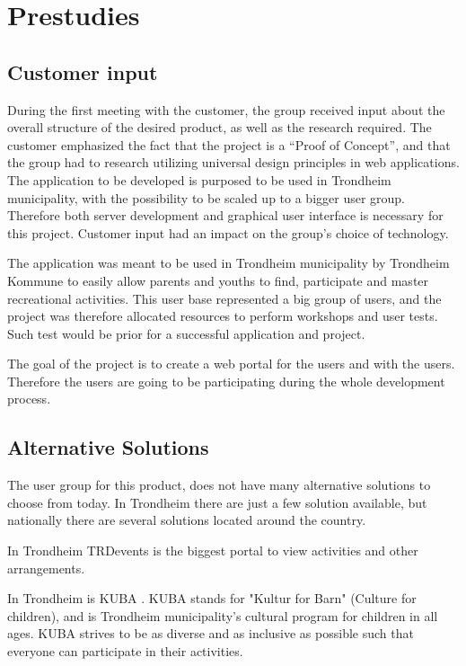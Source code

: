 
\chapter{Prestudies}


\section{Customer input}
During the first meeting with the customer, the group received input about the overall structure of the desired product, as well as the research required. The customer emphasized the fact that the project is a “Proof of Concept”, and that the group had to research utilizing universal design principles in web applications. The application to be developed is purposed to be used in Trondheim municipality, with the possibility to be scaled up to a bigger user group. Therefore both server development and graphical user interface is necessary for this project. Customer input had an impact on the group's choice of technology. 

The application was meant to be used in Trondheim municipality by Trondheim Kommune to easily allow parents and youths to find, participate and master recreational activities. This user base represented a big group of users, and the project was therefore allocated resources to perform workshops and user tests. Such test would be prior for a successful application and project. 

The goal of the project is to create a web portal for the users and with the users. Therefore the users are going to be participating during the whole development process.

\section{Alternative Solutions}
The user group for this product, does not have many alternative solutions to choose from today. In Trondheim there are just a few solution available, but nationally there are several solutions located around the country.

In Trondheim TRDevents \cite{TRDevents} is the biggest portal to view activities and other arrangements. 

In Trondheim is KUBA \cite{KUBA}. KUBA stands for "Kultur for Barn" (Culture for children), and is Trondheim municipality's cultural program for children in all ages. KUBA strives to be as diverse and as inclusive as possible such that everyone can participate in their activities.

